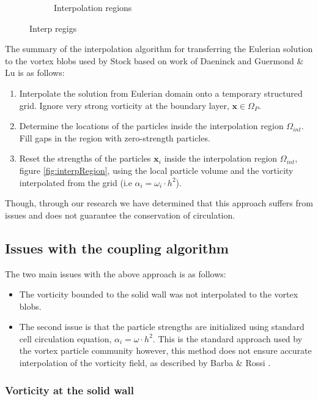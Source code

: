 \begin{figure}[t]
\begin{subfigure}[t]{0.6\textwidth}
             \caption{Interpolation regions}
             \label{fig:hybrid_domains_withInterpReg}
     \end{subfigure}

     \caption{Interp regigs}
     \label{fig:interpolationRegionDefinitions}
	\end{figure}	

The summary of the interpolation algorithm for transferring the Eulerian solution to the vortex blobs used by Stock based on work of Daeninck and Guermond \& Lu is as follows:
\begin{enumerate}
\item Interpolate the solution from Eulerian domain onto a temporary structured grid. Ignore very strong vorticity at the boundary layer, $\mathbf{x} \in \Omega_P$.
\item Determine the locations of the particles inside the interpolation region $\Omega_{int}$. Fill gaps in the region with zero-strength particles. 
\item Reset the strengths of the particles $\mathbf{x}_i$ inside the interpolation region $\Omega_{int}$, figure \ref{fig:interpRegion}, using the local particle volume and the vorticity interpolated from the grid (i.e $\alpha_i = \omega_i\cdot{h^2}$).
\end{enumerate}

Though, through our research we have determined that this approach suffers from issues and does not guarantee the conservation of circulation. 

\subsection*{Issues with the coupling algorithm}

The two main issues with the above approach is as follows:

\begin{itemize}
\item The vorticity bounded to the solid wall was not interpolated to the vortex blobs. 
\item The second issue is that the particle strengths are initialized using standard cell circulation equation, $\alpha_i = \omega \cdot h^2$. This is the standard approach used by the vortex particle community however, this method does not ensure accurate interpolation of the vorticity field, as described by Barba \& Rossi \cite{Barba2010a}.
\end{itemize}

\subsubsection*{Vorticity at the solid wall}

